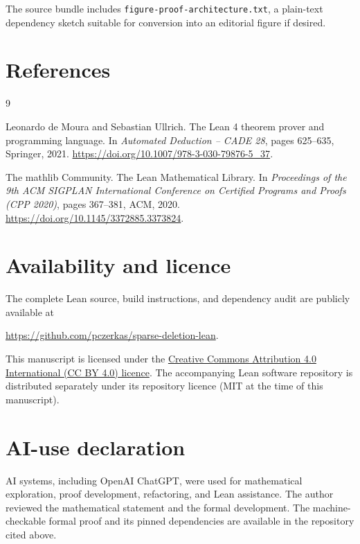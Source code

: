 \documentclass[11pt]{article}
\theoremstyle{definition}
\theoremstyle{remark}
\begin{document}
The source bundle includes \texttt{figure-proof-architecture.txt}, a
plain-text dependency sketch suitable for conversion into an editorial figure
if desired.

\section*{References}
\begin{thebibliography}{9}

Leonardo de Moura and Sebastian Ullrich.
\newblock The Lean 4 theorem prover and programming language.
\newblock In \emph{Automated Deduction -- CADE 28}, pages 625--635,
Springer, 2021.
\newblock \url{https://doi.org/10.1007/978-3-030-79876-5_37}.

The mathlib Community.
\newblock The Lean Mathematical Library.
\newblock In \emph{Proceedings of the 9th ACM SIGPLAN International
Conference on Certified Programs and Proofs (CPP 2020)}, pages 367--381,
ACM, 2020.
\newblock \url{https://doi.org/10.1145/3372885.3373824}.

\end{thebibliography}

\section*{Availability and licence}

The complete Lean source, build instructions, and dependency audit are publicly
available at
\begin{center}
\url{https://github.com/pczerkas/sparse-deletion-lean}.
\end{center}

This manuscript is licensed under the
\href{https://creativecommons.org/licenses/by/4.0/}{Creative Commons
Attribution 4.0 International (CC BY 4.0) licence}.  The accompanying Lean
software repository is distributed separately under its repository licence
(MIT at the time of this manuscript).

\section*{AI-use declaration}

AI systems, including OpenAI ChatGPT, were used for mathematical exploration,
proof development, refactoring, and Lean assistance.  The author reviewed the
mathematical statement and the formal development.  The machine-checkable
formal proof and its pinned dependencies are available in the repository cited
above.
\end{document}
